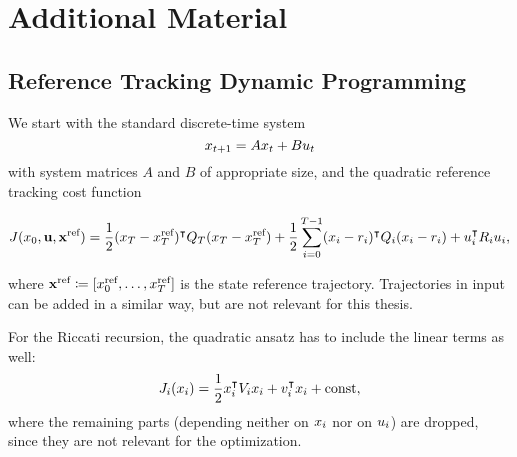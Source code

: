 \chapter{Additional Material}
\label{ch:appendix}

\section{Reference Tracking Dynamic Programming}
\label{app:reference-dp}

We start with the standard discrete-time system
\begin{equation}
  x_{t+1} = A x_t + B u_t
\end{equation}
with system matrices $A$ and $B$ of appropriate size, and the quadratic
reference tracking cost function
\begin{fullwidth}\vspace{-\baselineskip}
\begin{equation}
  J(x_0,\mathbf{u},\mathbf{x^\text{ref}}) = \frac{1}{2} (x_T - x^\text{ref}_T)^{\intercal} Q_T (x_T -
  x^\text{ref}_T) +
  \frac{1}{2} \sum_{i=0}^{T-1}
  (x_i - r_i)^{\intercal} Q_i (x_i - r_i) + u_i^{\intercal} R_i u_i,
\end{equation}
\end{fullwidth}
where $\mathbf{x^\text{ref}}\coloneqq [x^\text{ref}_0, \dots, x^\text{ref}_T]$ is the state reference
trajectory. Trajectories in input can be added in a similar way, but are not
relevant for this thesis.

For the Riccati recursion, the quadratic ansatz has to include the linear terms
as well:
\begin{equation}
  J_i(x_i) = \frac{1}{2} x_i^{\intercal} V_i x_i + v_i^{\intercal} x_i + \operatorname{const},
\end{equation}
where the remaining parts (depending neither on $x_i$ nor on $u_i$) are
dropped, since they are not relevant for the optimization.

